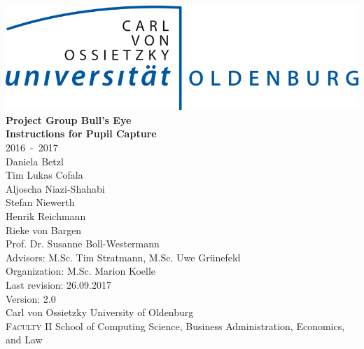 \documentclass[12pt,a4paper,twoside,openright]{scrreprt}
\begin{document}
\pagestyle{plain}

\begin{titlepage}

	\begin{center}
	\includegraphics[scale=0.3]{LogoUniOL.png}\\[2.2cm]
	\Huge{\textbf{Project Group Bull's Eye}}\\[0.4cm]
	\huge{\textbf{Instructions for Pupil Capture}}\\[0.5cm]
	\Large{2016~-~2017}\\[3ex]
	\large{
	Daniela Betzl\\
	Tim Lukas Cofala\\
	Aljoscha Niazi-Shahabi\\
	Stefan Niewerth\\
	Henrik Reichmann\\
	Rieke von Bargen\\
	}
	\vspace{1.5cm}
	\large{
				Prof. Dr. Susanne Boll-Westermann\\
				Advisors: M.Sc. Tim Stratmann, M.Sc. Uwe Gr\"unefeld\\
				Organization: M.Sc. Marion Koelle \\
				Last revision: 26.09.2017\\
				Version: 2.0\\
				Carl von Ossietzky University of Oldenburg\\
				\textsc{Faculty II } School of Computing Science, Business Administration, Economics, and Law 
			}
	\end{center}
\end{titlepage}


%

\tableofcontents %
\listoffigures \clearpage
{}
\clearpage
\setcounter{page}{1}
\end{document}
